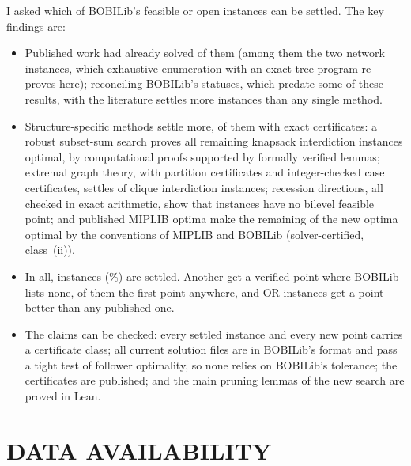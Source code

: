 \documentclass[]{spie}  %
\theoremstyle{plain}
\newcommand{\cls}[1]{class~(#1)}             %
\begin{document}
I asked which of BOBILib's \NumUnsolved{} feasible or open instances can be settled. The key
findings are:
\begin{itemize}
\item Published work had already solved \NumLitOptimal{} of them (among them the two network
instances, which exhaustive enumeration with an exact tree program re-proves here); reconciling
BOBILib's statuses,
which predate some of these results, with the literature settles more instances than any single
method.
\item Structure-specific methods settle \NumSettledHere{} more, \NumClassExactSettled{} of them
with exact certificates: a robust subset-sum search proves all \NumNewKip{} remaining knapsack
interdiction instances optimal, by computational proofs supported by formally verified lemmas;
extremal graph theory, with partition certificates and \NumCliquePartCases{} integer-checked case
certificates, settles \NumNewClique{} of \NumCliqueSet{} clique interdiction instances; recession
directions, all checked in exact arithmetic, show that \NumNoFeasible{}
instances have no bilevel feasible point; and published MIPLIB optima make the remaining
\NumNewHpr{} of the \NumNewOptimal{} new optima optimal by the conventions of MIPLIB and BOBILib
(solver-certified, \cls{ii}).
\item In all, \NumSettled{} instances (\PctSettled\%) are settled. Another \NumFirstPoint{} get a
verified point where BOBILib lists none, \NumFirstAnywhere{} of them the first point anywhere, and
\NumOrBetter{} OR instances get a point better than any published one.
\item The claims can be checked: every settled instance and every new point carries a certificate
class; all \NumTightFiles{} current solution files are in BOBILib's format and pass a tight test of
follower optimality, so none relies on BOBILib's tolerance; the certificates are published; and the
main pruning lemmas of the new search are proved in Lean.
\end{itemize}

\section*{DATA AVAILABILITY}
\end{document}
